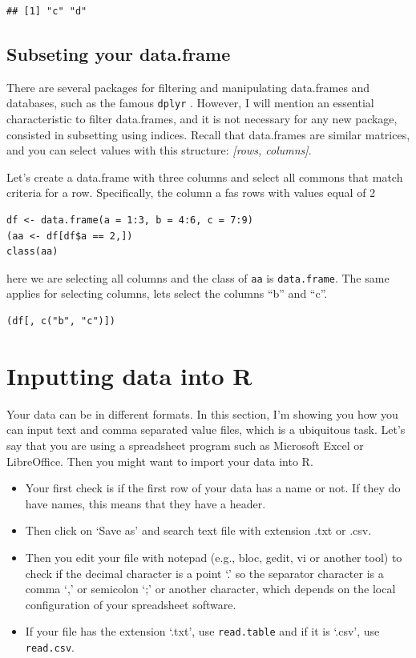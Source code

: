 \documentclass[12pt,graybox,envcountchap,sectrefs]{krantz}
\providecommand{\tightlist}{%
  \setlength{\itemsep}{0pt}\setlength{\parskip}{0pt}}
\theoremstyle{definition}
\theoremstyle{definition}
\theoremstyle{definition}
\theoremstyle{remark}
\begin{document}
\begin{verbatim}
## [1] "c" "d"
\end{verbatim}

\subsection{Subseting your data.frame}\label{subseting-your-data.frame}

There are several packages for filtering and manipulating data.frames
and databases, such as the famous \texttt{dplyr} \citep{dplyr}. However,
I will mention an essential characteristic to filter data.frames, and it
is not necessary for any new package, consisted in subsetting using
indices. Recall that data.frames are similar matrices, and you can
select values with this structure: \emph{{[}rows, columns{]}}.

Let's create a data.frame with three columns and select all commons that
match criteria for a row. Specifically, the column a fas rows with
values equal of 2

\begin{verbatim}
df <- data.frame(a = 1:3, b = 4:6, c = 7:9)
(aa <- df[df$a == 2,])
class(aa)
\end{verbatim}

here we are selecting all columns and the class of \texttt{aa} is
\texttt{data.frame}. The same applies for selecting columns, lets select
the columns ``b'' and ``c''.

\begin{verbatim}
(df[, c("b", "c")])
\end{verbatim}

\section{Inputting data into R}\label{inputting-data-into-r}

Your data can be in different formats. In this section, I'm showing you
how you can input text and comma separated value files, which is a
ubiquitous task. Let's say that you are using a spreadsheet program such
as Microsoft Excel or LibreOffice. Then you might want to import your
data into R.

\begin{itemize}
\tightlist
\item
  Your first check is if the first row of your data has a name or not.
  If they do have names, this means that they have a header.
\item
  Then click on `Save as' and search text file with extension .txt or
  .csv.
\item
  Then you edit your file with notepad (e.g., bloc, gedit, vi or another
  tool) to check if the decimal character is a point `.' so the
  separator character is a comma `,' or semicolon `;' or another
  character, which depends on the local configuration of your
  spreadsheet software.
\item
  If your file has the extension `.txt', use \texttt{read.table} and if
  it is `.csv', use \texttt{read.csv}.
\end{itemize}
\end{document}
